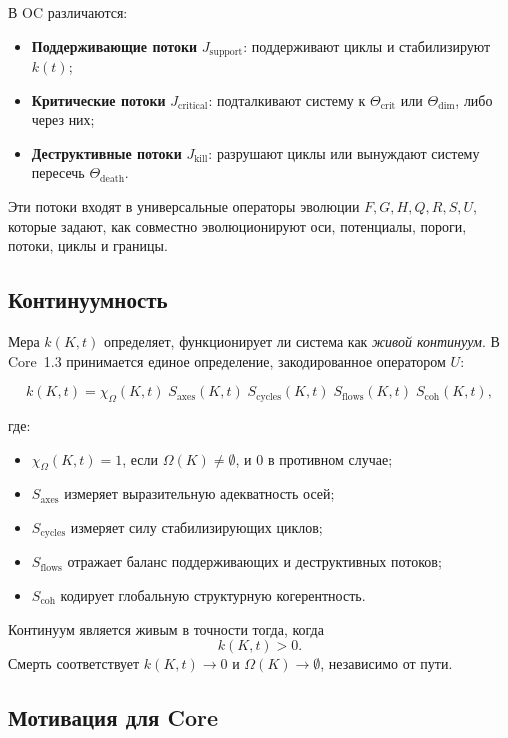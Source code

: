 В OC различаются:

\begin{itemize}
    \item \textbf{Поддерживающие потоки} \(J_{\mathrm{support}}\): поддерживают циклы и стабилизируют \(k(t)\);
    \item \textbf{Критические потоки} \(J_{\mathrm{critical}}\): подталкивают систему к \(\Theta_{\mathrm{crit}}\) или \(\Theta_{\mathrm{dim}}\), либо через них;
    \item \textbf{Деструктивные потоки} \(J_{\mathrm{kill}}\): разрушают циклы или вынуждают систему пересечь \(\Theta_{\mathrm{death}}\).
\end{itemize}

Эти потоки входят в универсальные операторы эволюции \(F, G, H, Q, R, S, U\), которые задают, как совместно эволюционируют оси, потенциалы, пороги, потоки, циклы и границы.

\subsection{Континуумность}

Мера \(k(K,t)\) определяет, функционирует ли система как \emph{живой континуум}.
В Core~1.3 принимается единое определение, закодированное оператором \(U\):

\[
k(K,t) =
\chi_{\Omega}(K,t)\;
S_{\mathrm{axes}}(K,t)\;
S_{\mathrm{cycles}}(K,t)\;
S_{\mathrm{flows}}(K,t)\;
S_{\mathrm{coh}}(K,t),
\]

где:

\begin{itemize}
    \item \(\chi_{\Omega}(K,t)=1\), если \(\Omega(K)\neq\emptyset\), и \(0\) в противном случае;
    \item \(S_{\mathrm{axes}}\) измеряет выразительную адекватность осей;
    \item \(S_{\mathrm{cycles}}\) измеряет силу стабилизирующих циклов;
    \item \(S_{\mathrm{flows}}\) отражает баланс поддерживающих и деструктивных потоков;
    \item \(S_{\mathrm{coh}}\) кодирует глобальную структурную когерентность.
\end{itemize}

Континуум является живым в точности тогда, когда
\[
k(K,t) > 0.
\]
Смерть соответствует \(k(K,t)\to 0\) и \(\Omega(K)\to\emptyset\), независимо от пути.

\subsection{Мотивация для Core}

